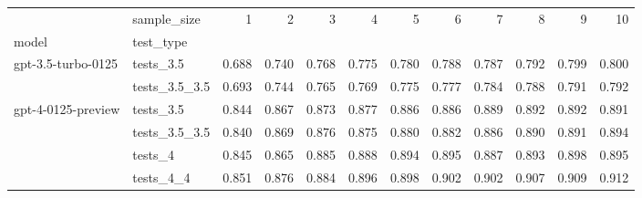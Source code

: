 \begin{tabular}{llrrrrrrrrrr}
\toprule
 & sample_size & 1 & 2 & 3 & 4 & 5 & 6 & 7 & 8 & 9 & 10 \\
model & test_type &  &  &  &  &  &  &  &  &  &  \\
\midrule
\multirow[t]{2}{*}{gpt-3.5-turbo-0125} & tests_3.5 & 0.688 & 0.740 & 0.768 & 0.775 & 0.780 & 0.788 & 0.787 & 0.792 & 0.799 & 0.800 \\
 & tests_3.5_3.5 & 0.693 & 0.744 & 0.765 & 0.769 & 0.775 & 0.777 & 0.784 & 0.788 & 0.791 & 0.792 \\
\cline{1-12}
\multirow[t]{4}{*}{gpt-4-0125-preview} & tests_3.5 & 0.844 & 0.867 & 0.873 & 0.877 & 0.886 & 0.886 & 0.889 & 0.892 & 0.892 & 0.891 \\
 & tests_3.5_3.5 & 0.840 & 0.869 & 0.876 & 0.875 & 0.880 & 0.882 & 0.886 & 0.890 & 0.891 & 0.894 \\
 & tests_4 & 0.845 & 0.865 & 0.885 & 0.888 & 0.894 & 0.895 & 0.887 & 0.893 & 0.898 & 0.895 \\
 & tests_4_4 & 0.851 & 0.876 & 0.884 & 0.896 & 0.898 & 0.902 & 0.902 & 0.907 & 0.909 & 0.912 \\
\cline{1-12}
\bottomrule
\end{tabular}
